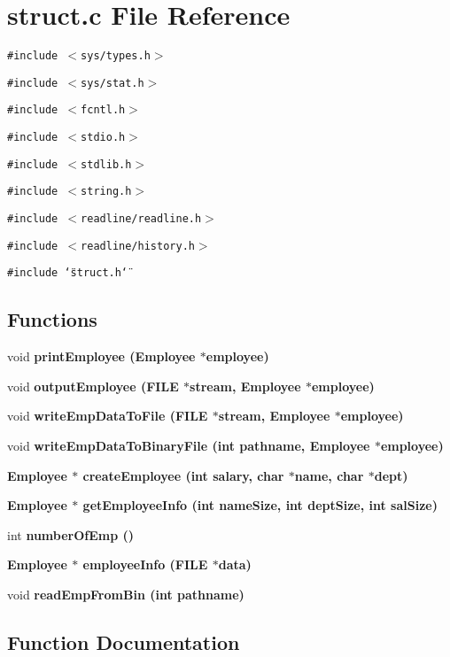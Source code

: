 \section{struct.c File Reference}
\label{struct_8c}
{\tt \#include $<$sys/types.h$>$}\par
{\tt \#include $<$sys/stat.h$>$}\par
{\tt \#include $<$fcntl.h$>$}\par
{\tt \#include $<$stdio.h$>$}\par
{\tt \#include $<$stdlib.h$>$}\par
{\tt \#include $<$string.h$>$}\par
{\tt \#include $<$readline/readline.h$>$}\par
{\tt \#include $<$readline/history.h$>$}\par
{\tt \#include \char`\"{}struct.h\char`\"{}}\par
\subsection*{Functions}
\begin{CompactItemize}
\item 
void \bf{print\-Employee} (\bf{Employee} $\ast$employee)
\item 
void \bf{output\-Employee} (FILE $\ast$stream, \bf{Employee} $\ast$employee)
\item 
void \bf{write\-Emp\-Data\-To\-File} (FILE $\ast$stream, \bf{Employee} $\ast$employee)
\item 
void \bf{write\-Emp\-Data\-To\-Binary\-File} (int pathname, \bf{Employee} $\ast$employee)
\item 
\bf{Employee} $\ast$ \bf{create\-Employee} (int salary, char $\ast$name, char $\ast$dept)
\item 
\bf{Employee} $\ast$ \bf{get\-Employee\-Info} (int name\-Size, int dept\-Size, int sal\-Size)
\item 
int \bf{number\-Of\-Emp} ()
\item 
\bf{Employee} $\ast$ \bf{employee\-Info} (FILE $\ast$data)
\item 
void \bf{read\-Emp\-From\-Bin} (int pathname)
\end{CompactItemize}


\subsection{Function Documentation}
